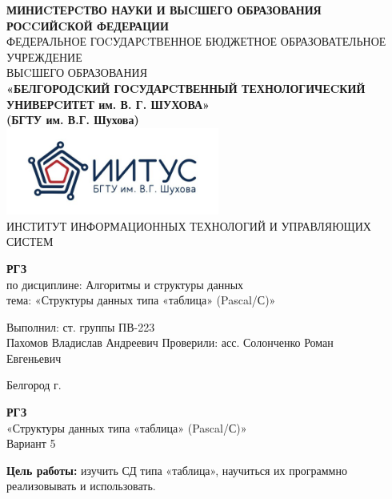 \documentclass[a4paper,14pt]{extarticle}
\newcommand\textbox[1]{
	\parbox{.45\textwidth}{#1}
}
\begin{document}
\begin{center}
    \small{
        \textbf{МИНИCТЕРCТВО НАУКИ И ВЫCШЕГО ОБРАЗОВАНИЯ РОCCИЙCКОЙ ФЕДЕРАЦИИ}\\
        ФЕДЕРАЛЬНОЕ ГОCУДАРCТВЕННОЕ БЮДЖЕТНОЕ ОБРАЗОВАТЕЛЬНОЕ УЧРЕЖДЕНИЕ\\ВЫCШЕГО ОБРАЗОВАНИЯ \\
        \textbf{«БЕЛГОРОДCКИЙ ГОCУДАРCТВЕННЫЙ ТЕХНОЛОГИЧЕCКИЙ\\УНИВЕРCИТЕТ им. В. Г. ШУХОВА»\\ (БГТУ им. В.Г. Шухова)} \\
        \bigbreak
        \includegraphics[width=70mm]{log}\\
        ИНСТИТУТ ИНФОРМАЦИОННЫХ ТЕХНОЛОГИЙ И УПРАВЛЯЮЩИХ СИСТЕМ\\}
\end{center}

\vfill
\begin{center}
	\large{
		\textbf{
			РГЗ}}\\
	\normalsize{
		по дисциплине: Алгоритмы и структуры данных \\
		тема: «Структуры данных типа «таблица» (Pascal/С)»}
\end{center}
\vfill
\hfill\textbox{
	Выполнил: ст. группы ПВ-223\\Пахомов Владислав Андреевич
	\bigbreak
	Проверили: асс. Солонченко Роман\\Евгеньевич
}
\vfill\begin{center}
	Белгород \the\year г.
\end{center}
\newpage
\begin{center}
	\textbf{РГЗ}\\
	«Структуры данных типа «таблица» (Pascal/С)»\\
	Вариант 5
\end{center}
\textbf{Цель работы: }изучить СД типа «таблица», научиться их программно 
реализовывать и использовать.
\end{document}
